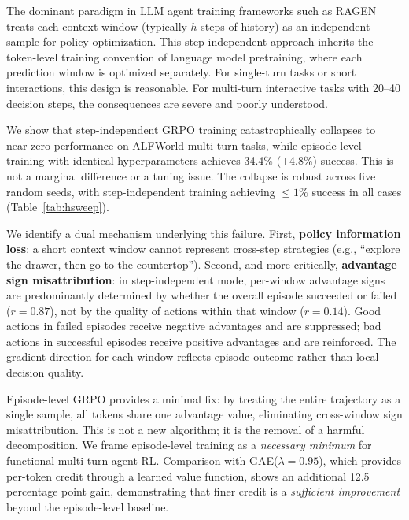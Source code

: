 \documentclass[11pt]{article}
\begin{document}
The dominant paradigm in LLM agent training frameworks such as RAGEN treats each context window (typically $h$ steps of history) as an independent sample for policy optimization. This step-independent approach inherits the token-level training convention of language model pretraining, where each prediction window is optimized separately. For single-turn tasks or short interactions, this design is reasonable. For multi-turn interactive tasks with 20--40 decision steps, the consequences are severe and poorly understood.

We show that step-independent GRPO training catastrophically collapses to near-zero performance on ALFWorld multi-turn tasks, while episode-level training with identical hyperparameters achieves 34.4\% ($\pm$4.8\%) success. This is not a marginal difference or a tuning issue. The collapse is robust across five random seeds, with step-independent training achieving $\leq 1\%$ success in all cases (Table~\ref{tab:hsweep}).

We identify a dual mechanism underlying this failure. First, \textbf{policy information loss}: a short context window cannot represent cross-step strategies (e.g., ``explore the drawer, then go to the countertop''). Second, and more critically, \textbf{advantage sign misattribution}: in step-independent mode, per-window advantage signs are predominantly determined by whether the overall episode succeeded or failed ($r=0.87$), not by the quality of actions within that window ($r=0.14$). Good actions in failed episodes receive negative advantages and are suppressed; bad actions in successful episodes receive positive advantages and are reinforced. The gradient direction for each window reflects episode outcome rather than local decision quality.

Episode-level GRPO provides a minimal fix: by treating the entire trajectory as a single sample, all tokens share one advantage value, eliminating cross-window sign misattribution. This is not a new algorithm; it is the removal of a harmful decomposition. We frame episode-level training as a \emph{necessary minimum} for functional multi-turn agent RL. Comparison with GAE($\lambda=0.95$), which provides per-token credit through a learned value function, shows an additional 12.5 percentage point gain, demonstrating that finer credit is a \emph{sufficient improvement} beyond the episode-level baseline.
\end{document}
